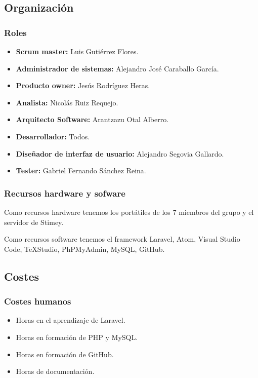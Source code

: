 \documentclass[12pt,letterpaper]{article}
\begin{document}
\subsection{Organización}
\subsubsection{Roles}
\begin{itemize}
	\item \textbf{Scrum master:} Luis Gutiérrez Flores.
	\item \textbf{Administrador de sistemas:} Alejandro José Caraballo García.
	\item \textbf{Producto owner:} Jesús Rodríguez Heras.
	\item \textbf{Analista:} Nicolás Ruiz Requejo.
	\item \textbf{Arquitecto Software:} Arantzazu Otal Alberro.
	\item \textbf{Desarrollador:} Todos.
	\item \textbf{Diseñador de interfaz de usuario:} Alejandro Segovia Gallardo.
	\item \textbf{Tester:} Gabriel Fernando Sánchez Reina.
\end{itemize}

\subsubsection{Recursos hardware y sofware}
Como recursos hardware tenemos los portátiles de los 7 miembros del grupo y el servidor de Stimey.

Como recursos software tenemos el framework Laravel, Atom, Visual Studio Code, TeXStudio, PhPMyAdmin, MySQL, GitHub.

\subsection{Costes}
\subsubsection{Costes humanos}
\begin{itemize}
	\item Horas en el aprendizaje de Laravel.
	\item Horas en formación de PHP y MySQL.
	\item Horas en formación de GitHub.
	\item Horas de documentación.
\end{itemize}
\end{document}
